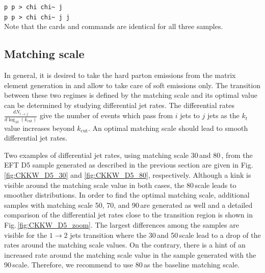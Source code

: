 \texttt{p p > chi chi\~{ } j}\\

\texttt{p p > chi chi\~{ } j j}\\
Note that the \madgraph cards and \pythiaEight commands are identical for all three samples.




\subsection{Matching scale}

In general, it is desired to take the hard parton emissions from the matrix element generation in \madgraph and allow \pythiaEight to take care of soft emissions only. The transition between these two regimes is defined by the matching scale and its optimal value can be determined by studying differential jet rates. The differential rates $\frac{dN_{i\to j}}{d \log_{10}(k_\textrm{cut})}$ give the number of events which pass from $i$ jets to $j$ jets as the $k_t$ value increases beyond $k_\textrm{cut}$. An optimal matching scale should lead to smooth differential jet rates.

Two examples of differential jet rates, using matching scale 30\,\gev and 80\,\gev, from the EFT D5 sample generated as described in the previous section are given in Fig.\,\ref{fig:CKKW_D5_30} and \ref{fig:CKKW_D5_80}, respectively.
Although a kink is visible around the matching scale value in both cases, the 80\,\gev scale leads to smoother distributions. 
In order to find the optimal matching scale, additional samples with matching scale 50, 70, and 90\,\gev are generated as well and a detailed comparison of the differential jet rates close to the transition region is shown in Fig.\,\ref{fig:CKKW_D5_zoom}.
The largest differences among the samples are visible for the $1\rightarrow2$ jets transition where the 30\,\gev and 50\,\gev scale lead to a drop of the rates around the matching scale values. On the contrary, there is a hint of an increased rate around the matching scale value in the sample generated with the 90\,\gev scale. Therefore, we recommend to use 80\,\gev as the baseline matching scale.


